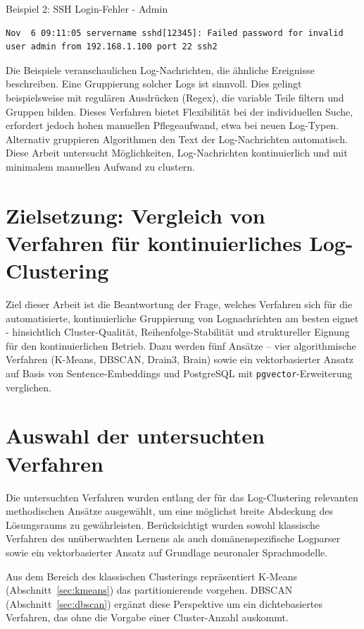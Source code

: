 \begin{logbox}{Beispiel 2: \ac{SSH} Login-Fehler - Admin}
\begin{lstlisting}
Nov  6 09:11:05 servername sshd[12345]: Failed password for invalid user admin from 192.168.1.100 port 22 ssh2
\end{lstlisting}
\end{logbox}


Die Beispiele veranschaulichen Log-Nachrichten, die ähnliche Ereignisse beschreiben. Eine Gruppierung solcher Logs ist sinnvoll. Dies gelingt beispielsweise mit regulären Ausdrücken (\acs{Regex}), die variable Teile filtern und Gruppen bilden. Dieses Verfahren bietet Flexibilität bei der individuellen Suche, erfordert jedoch hohen manuellen Pflegeaufwand, etwa bei neuen Log-Typen. Alternativ gruppieren Algorithmen den Text der Log-Nachrichten automatisch. Diese Arbeit untersucht Möglichkeiten, Log-Nachrichten kontinuierlich und mit minimalem manuellen Aufwand zu clustern.

\section{Zielsetzung: Vergleich von Verfahren für kontinuierliches Log-Clustering} \label{forschungs_frage}
Ziel dieser Arbeit ist die Beantwortung der Frage, welches Verfahren sich für die automatisierte, kontinuierliche Gruppierung von Lognachrichten am besten eignet - hinsichtlich Cluster-Qualität, Reihenfolge-Stabilität und
struktureller Eignung für den kontinuierlichen Betrieb. Dazu werden fünf Ansätze -- vier algorithmische Verfahren (K-Means, DBSCAN, Drain3, Brain) sowie ein vektorbasierter Ansatz auf Basis von Sentence-Embeddings und PostgreSQL mit \texttt{pgvector}-Erweiterung verglichen.

\section{Auswahl der untersuchten Verfahren}
\label{sec:auswahl}
Die untersuchten Verfahren wurden entlang der für das Log-Clustering 
relevanten methodischen Ansätze ausgewählt, um eine möglichst breite 
Abdeckung des Lösungsraums zu gewährleisten. Berücksichtigt wurden 
sowohl klassische Verfahren des unüberwachten Lernens als auch 
domänenspezifische Logparser sowie ein vektorbasierter Ansatz auf 
Grundlage neuronaler Sprachmodelle.

Aus dem Bereich des klassischen Clusterings repräsentiert K-Means
(Abschnitt~\ref{sec:kmeans}) das partitionierende vorgehen. DBSCAN
(Abschnitt~\ref{sec:dbscan}) ergänzt diese Perspektive um ein
dichtebasiertes Verfahren, das ohne die Vorgabe einer Cluster-Anzahl
auskommt.

